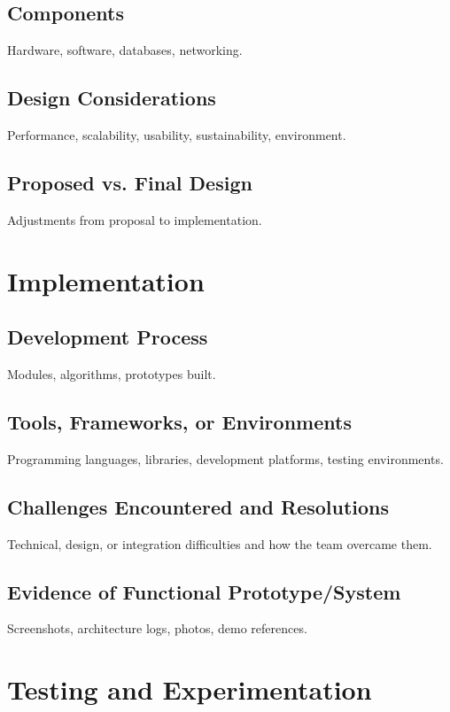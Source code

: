 \documentclass[12pt]{article}
\begin{document}
\subsection{Components}
Hardware, software, databases, networking.

\subsection{Design Considerations}
Performance, scalability, usability, sustainability, environment.

\subsection{Proposed vs. Final Design}
Adjustments from proposal to implementation.

\section{Implementation}

\subsection{Development Process}
Modules, algorithms, prototypes built.

\subsection{Tools, Frameworks, or Environments}
Programming languages, libraries, development platforms, testing environments.

\subsection{Challenges Encountered and Resolutions}
Technical, design, or integration difficulties and how the team overcame them.

\subsection{Evidence of Functional Prototype/System}
Screenshots, architecture logs, photos, demo references.

\section{Testing and Experimentation}
\end{document}

